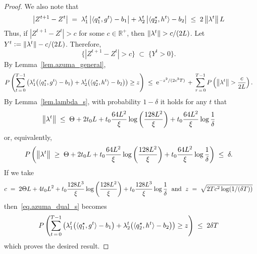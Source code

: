 \documentclass[12pt, final]{l4dc2023}
\begin{document}
\begin{proof}
	We also note that
	\[
	\left|Z^{t+1}-Z^{t}\right| 
	\; = \; 
	\lambda_1^{t} \left|\langle{ q_1^\star},{g^{t}}\rangle -b_1\right|
	+
	\lambda_2^{t} \left| \langle{ q_2^\star},{h^{t}}\rangle -b_2\right|
	\; \leq \;
	2 \left\|{\lambda^{t}}\right\| L
	\]
	Thus, if $|Z^{t+1}-Z^t|> c$ for some $c\in\mathbb{R}^+$, then $ \norm{\lambda^t}> c/(2L)$. Let $Y^t \mathrel{\mathop:}= \left\|{\lambda^t}\right\| - c/(2L)$. Therefore,
	\[
	\{ |Z^{t+1}-Z^t|> c \}  \;\subset\;  \{ Y^t > 0 \}.
	\]
	By Lemma~\ref{lem.azuma_general},
	\begin{equation}\label{eq.azuma_dual_s}
	P \rbr{ \sum_{t\,=\,0}^{T-1}
		\left(
		\lambda_1^{t} \big(\langle{ q_1^\star},{g^{t}}\rangle - b_1\big)
		+
		\lambda_2^{t} \big( \langle{ q_2^\star},{h^{t}}\rangle - b_2\big)
		\right)
		\geq z } \;\leq\; {\rm e}^{-z^2/ (2c^2T)} \,+\, \sum_{\tau\,=\,0}^{T-1} P \rbr{ \norm{\lambda^t}>\frac{c}{2L}}.
	\end{equation}
	By Lemma~\ref{lem.lambda_s}, with probability $1-\delta$ it holds for any $t$ that
	\[
	\left\|{\lambda^t}\right\| \; \leq\; \displaystyle \Theta + 2 t_0L + t_0 \frac{64 L^2}{\xi} \log \left(\frac{128 L^2}{\xi}\right) + t_0 \frac{64 L^2}{\xi} \log\frac{1}{\delta}
	\]
	or, equivalently,
	\[
	P \left(
		\left\|{\lambda^t}\right\| \;\geq\; \displaystyle \Theta + 2 t_0L + t_0 \frac{64 L^2}{\xi} \log \left(\frac{128 L^2}{\xi}\right) + t_0 \frac{64 L^2}{\xi} \log\frac{1}{\delta}
	\right) \;\leq\; \delta.
	\]
	If we take 
	\[
	c\;=\;  2\Theta L + 4 t_0 L^2 + t_0 \frac{128 L^3}{\xi} \log \left(\frac{128 L^2}{\xi}\right) + t_0 \frac{128 L^3}{\xi} \log\frac{1}{\delta}
	\;\text{ and }\;
	z\;=\;\sqrt{2T c^2 \log (1/(\delta T))}
	\]
	then~\eqref{eq.azuma_dual_s} becomes
	\[
	P \left( \sum_{t\,=\,0}^{T-1}
		\left(
		\lambda_1^{t} \big(\langle{ q_1^\star},{g^{t}}\rangle -b_1\big)
		+
		\lambda_2^{t} \big( \langle{ q_2^\star},{h^{t}}\rangle -b_2\big)
		\right)
		\geq z \right) 
	\;\leq\; 
	2\delta  T
	\]
	which proves the desired result.
\end{proof}
\end{document}
